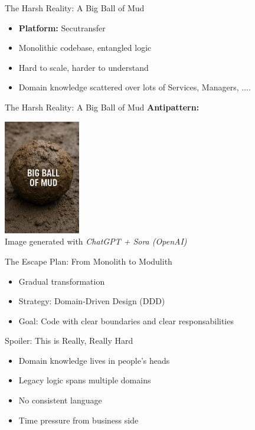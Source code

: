 \documentclass[aspectratio=169,12pt]{beamer}
\begin{document}
\begin{frame}{The Harsh Reality: A Big Ball of Mud}
\begin{itemize}
    \item \textbf{Platform:} Secutransfer
    \item Monolithic codebase, entangled logic
    \item Hard to scale, harder to understand
    \item Domain knowledge scattered over lots of Services, Managers, ....
\end{itemize}
\end{frame}
\begin{frame}{The Harsh Reality: A Big Ball of Mud}
    \textbf{Antipattern:}
    \begin{center}
        \includegraphics[width=0.25\textwidth]{./img/BBoM.png} \\
        \vspace{0.3cm}
        \tiny Image generated with \textit{ChatGPT + Sora (OpenAI)}
    \end{center}
\end{frame}

\begin{frame}{The Escape Plan: From Monolith to Modulith}
\begin{itemize}
    \item Gradual transformation
    \item Strategy: Domain-Driven Design (DDD)
    \item Goal: Code with clear boundaries and clear responsabilities
\end{itemize}
\end{frame}

\begin{frame}{Spoiler: This is Really, Really Hard}
\begin{itemize}
    \item Domain knowledge lives in people's heads
    \item Legacy logic spans multiple domains
    \item No consistent language
    \item Time pressure from business side
\end{itemize}
\end{frame}
\end{document}
